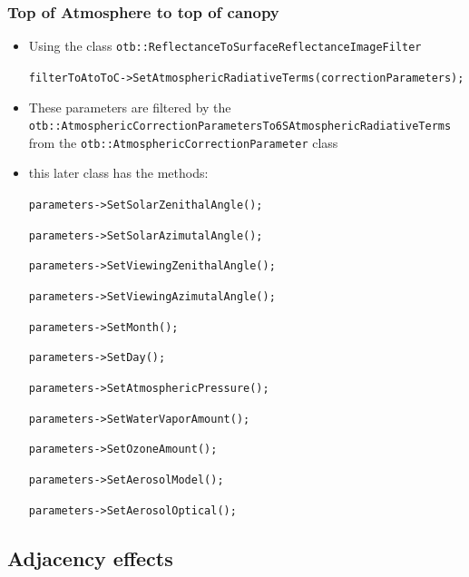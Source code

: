 \documentclass[compress]{beamer}
\begin{document}
\begin{frame}

  \frametitle{Top of Atmosphere to top of canopy}
  \begin{itemize}
  \tiny
  \item Using the class \texttt{otb::ReflectanceToSurfaceReflectanceImageFilter}

  \texttt{filterToAtoToC->SetAtmosphericRadiativeTerms(correctionParameters);}

  \item These parameters are filtered by the \texttt{otb::AtmosphericCorrectionParametersTo6SAtmosphericRadiativeTerms} from the \texttt{otb::AtmosphericCorrectionParameter} class 

\item this later class has the methods:

\texttt{parameters->SetSolarZenithalAngle();}

\texttt{parameters->SetSolarAzimutalAngle();}

\texttt{parameters->SetViewingZenithalAngle();}

\texttt{parameters->SetViewingAzimutalAngle();}

\texttt{parameters->SetMonth();}

\texttt{parameters->SetDay();}

\texttt{parameters->SetAtmosphericPressure();}

\texttt{parameters->SetWaterVaporAmount();}

\texttt{parameters->SetOzoneAmount();}

\texttt{parameters->SetAerosolModel();}

\texttt{parameters->SetAerosolOptical();}
\end{itemize}
\end{frame}


\subsection{Adjacency effects}
\end{document}

